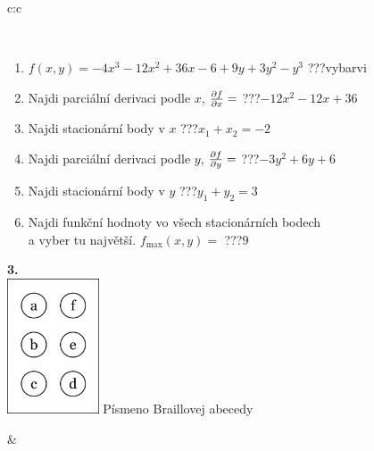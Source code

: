 \documentclass[10pt]{report}
\begin{document}
\begin{tabular}{c:c}
\begin{minipage}[c][104.5mm][t]{0.5\linewidth}
\begin{center}
\begin{minipage}{0.95\linewidth}
\begin{center}
\end{center}
\end{minipage}
\\[1mm]
\begin{minipage}{0.79\linewidth}
\begin{center}
\begin{varwidth}{\linewidth}
\begin{enumerate}
\normalsize
\item $f(x,y)=-4x^3-12x^2+36x-6+9y+3y^2-y^3$\quad \dotfill\; ???\;\dotfill \quad vybarvi
\item Najdi parciální derivaci podle $x$, $\pdv{f}{x}=$\quad \dotfill\; ???\;\dotfill \quad $-12x^2-12x+36$
\item Najdi stacionární body v $x$\quad \dotfill\; ???\;\dotfill \quad $x_1+x_2=-2$
\item Najdi parciální derivaci podle $y$, $\pdv{f}{y}=$\quad \dotfill\; ???\;\dotfill \quad $-3y^2+6y+6$
\item Najdi stacionární body v $y$\quad \dotfill\; ???\;\dotfill \quad $y_1+y_2=3$
\item Najdi funkční hodnoty vo všech stacionárních bodech \\ \phantom{xxxxxx} a vyber tu najvětší. $f_{\text{max}}(x,y)=$\quad \dotfill\; ???\;\dotfill \quad $9$
\end{enumerate}
\end{varwidth}
\end{center}
\end{minipage}
\begin{minipage}{0.20\linewidth}
\begin{center}
{\Huge\bfseries 3.} \\[2mm]
\includegraphics[height=40mm]{../images/braille.png}
{\small Písmeno Braillovej abecedy}
\end{center}
\end{minipage}
\end{center}
\end{minipage}
&
\begin{minipage}[c][104.5mm][t]{0.5\linewidth}
\begin{center}

\end{center}
\end{minipage}
\end{tabular}
\end{document}
